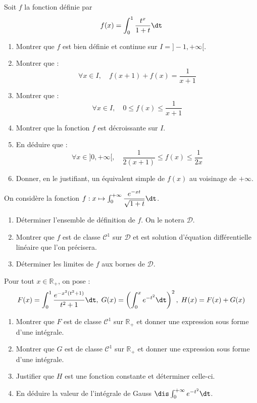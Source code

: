 \documentclass[a4paper,10pt]{report}
\begin{document}
\begin{Exercice}{} Soit $f$ la fonction d\'efinie par 
$$f(x)=\int_0^1 \frac{t^x}{1+t} \dt$$
	\begin{enumerate}
	\item Montrer que $f$ est bien d\'efinie et continue sur $I=]-1, + \infty[$.

	\item Montrer que :
$$\forall x\in I,\quad f(x+1)+f(x)=\frac1{x+1}$$

	\item Montrer que :
$$\forall x\in I,\quad 0\leq f(x) \leq \frac1{x+1}$$

	\item Montrer que la fonction $f$ est d\'ecroissante sur $I$.

	\item En d\'eduire que :
$$\forall x\in]0,+\infty[,\quad \frac1{2(x+1)} \leq f(x) \leq \frac1{2x}$$

	\item Donner, en le justifiant, un \'equivalent simple de $f(x)$ au voisinage de $+\infty$.
	\end{enumerate}
\end{Exercice}



\begin{Exercice}{} On considère la fonction $f : x \mapsto \int_0^{+ \infty} \dfrac{e^{-xt}}{\sqrt{1+t}} \dt$.
\begin{enumerate}
\item Déterminer l'ensemble de définition de $f$. On le notera $\mathcal{D}$.
\item Montrer que $f$ est de classe $\mathcal{C}^1$ sur $\mathcal{D}$ et est solution d'équation différentielle linéaire que l'on précisera.
\item Déterminer les limites de $f$ aux bornes de $\mathcal{D}$.
\end{enumerate}
\end{Exercice}



\begin{Exercice}{} Pour tout $x \in \mathbb{R}_+$, on pose :
 $$ F(x) = \int_{0}^1 \frac{e^{-x^2(t^2+1)}}{t^2+1} \dt, \; G(x) = \left( \int_{0}^x e^{-t^2} \dt \right)^2, \; H(x)=F(x)+G(x)$$
 
 \begin{enumerate}
 \item Montrer que $F$ est de classe $\mathcal{C}^1$ sur $\mathbb{R}_+$ et donner une expression sous forme d'une intégrale.
 \item Montrer que $G$ est de classe $\mathcal{C}^1$ sur $\mathbb{R}_+$ et donner une expression sous forme d'une intégrale.
 \item Justifier que $H$ est une fonction constante et déterminer celle-ci.
 \item En déduire la valeur de l'intégrale de Gauss $\dis \int_{0}^{+ \infty} e^{-t^2} \dt$.
 \end{enumerate}
\end{Exercice}
\end{document}
